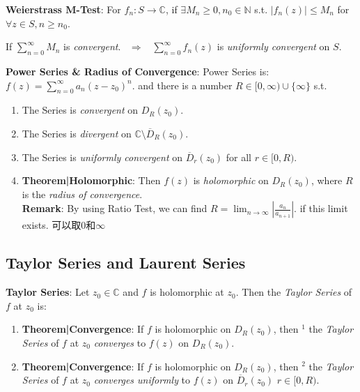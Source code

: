 \documentclass[9pt]{article}
\begin{document}
\textbf{Weierstrass M-Test}: For $f_n:S\to\mathbb{C}$, if $\exists M_n\geq 0,n_0\in\mathbb{N}$ s.t. $|f_n(z)|\leq M_n$ for $\forall z\in S,n\geq n_0$. 

\hspace{156pt}If $\sum^\infty_{n=0}M_n$ is \textit{convergent}. \ $\Rightarrow$ \ $\sum^\infty_{n=0}f_n(z)$ is \textit{uniformly convergent} on $S$.

\textbf{Power Series \& Radius of Convergence}: Power Series is: $f(z)=\sum^\infty_{n=0}a_n(z-z_0)^n$. \quad and there is a number $R\in[0,\infty)\cup\{\infty\}$ s.t.

\begin{enumerate}[itemsep=-2pt, topsep=-2pt]
    \item The Series is \textit{convergent} on $D_{R}(z_0)$.
    \item The Series is \textit{divergent} on $\mathbb{C}\setminus \overline{D}_{R}(z_0)$.
    \item The Series is \textit{uniformly convergent} on $\overline{D}_{r}(z_0)$ for all $r\in[0,R)$.
    \item \textbf{Theorem|Holomorphic}: Then $f(z)$ is \textit{holomorphic} on $D_{R}(z_0)$, where $R$ is the \textit{radius of convergence}. \\
    \textbf{Remark}: By using Ratio Test, we can find $R=\lim_{n\to\infty}\left|\frac{a_n}{a_{n+1}}\right|$. {\scriptsize if this limit exists. 可以取0和$\infty$}
\end{enumerate}


\subsection{Taylor Series and Laurent Series} %

\textbf{Taylor Series}: Let $z_0\in\mathbb{C}$ and $f$ is holomorphic at $z_0$. Then the \textit{Taylor Series} of $f$ at $z_0$ is: 

\begin{enumerate}[itemsep=-2pt, topsep=-2pt]
    \item \textbf{Theorem|Convergence}: {\footnotesize If $f$ is holomorphic on $D_{R}(z_0)$, then $^1$ the \textit{Taylor Series} of $f$ at $z_0$} \textit{converges} to $f(z)$ on $D_{R}(z_0)$.
    \item \textbf{Theorem|Convergence}: {\footnotesize If $f$ is holomorphic on $D_{R}(z_0)$, then $^2$ the \textit{Taylor Series} of $f$ at $z_0$} \textit{converges uniformly} to $f(z)$ on $\overline{D}_{r}(z_0)$ {\scriptsize $r\in[0,R)$}.
\end{enumerate}
\end{document}
